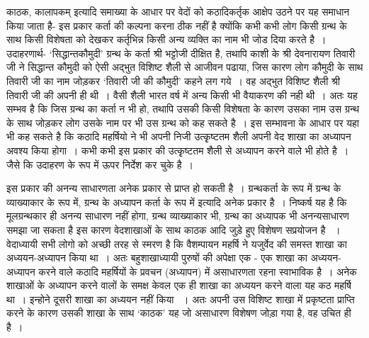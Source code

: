 काठक, कालापकम् इत्यादि समाख्या के आधार पर वेदों को कठादिकर्तृक आक्षेप उठने पर यह समाधान किया जाता है- इस प्रकार कर्ता की कल्पना करना ठीक नहीं है क्योंकि कभी कभी लोग किसी ग्रन्थ के साथ किसी विशेषता को देखकर कर्तृभिन्न किसी अन्य व्यक्ति का नाम भी जोड दिया करते है~। उदाहरणार्थ- ‘सिद्धान्तकौमुदी' ग्रन्थ के कर्ता श्री भट्टोजी दीक्षित है, तथापि काशी के श्री देवनारायण तिवारी जी ने सिद्धान्त कौमुदी को ऐसी अद्भुत विशिष्ट शैली से आजीवन पढाया, जिस कारण लोग कौमुदी के साथ तिवारी जी का नाम जोड़कर ‘तिवारी जी की कौमुदी' कहने लग गये~। वह अद्भुत विशिष्ट शैली श्री तिवारी जी की अपनी ही थी~। वैसी शैली भारत वर्ष में अन्य किसी भी वैयाकरण की नही थी~। अतः यह सम्भव है कि जिस ग्रन्थ का कर्ता न भी हो, तथापि उसकी किसी विशेषता के कारण उसका नाम उस ग्रन्थ के साथ जोड़कर लोग उसके नाम पर भी उस ग्रन्थ को कह सकते है~। इस सम्भावना के आधार पर यहा भी कह सकते है कि कठादि महर्षियो ने भी अपनी निजी उत्कृृष्टतम शैली अपनी वेद शाखा का अध्यापन अवश्य किया होगा~। कभी कभी इस प्रकार की उत्कृृष्टतम शैली से अध्यापन करने वाले भी होते है~। जैसे कि उदाहरण के रूप में ऊपर निर्देश कर चुके है~। 

इस प्रकार की अनन्य साधारणता अनेक प्रकार से प्राप्त हो सकती है~। ग्रन्थकर्ता के रूप में ग्रन्थ के व्याख्याकार के रूप में, ग्रन्थ के अध्यापन कर्ता के रूप में इत्यादि अनेक प्रकार है~। निष्कर्ष यह है कि मूलग्रन्थकार ही अनन्य साधारण नहीं होगा, ग्रन्थ व्याख्याकार भी, ग्रन्थ का अध्यापक भी अनन्यसाधारण समझा जा सकता है इस कारण वेदशाखाओं के साथ काठक आदि जुड़े हुए विशेषण सप्रयोजन है ~। वेदाध्यायी सभी लोगो को अच्छी तरह से स्मरण है कि वैशम्पायन महर्षि ने यजुर्वेद की समस्त शाखा का अध्ययन-अध्यापन किया था~। अतः बहुशाखाध्यायी पुरुषों की अपेक्षा एक - एक शाखा का अध्ययन-अध्यापन करने वाले कठादि महर्षियों के प्रवचन (अध्यापन) में असाधारणता रहना स्वाभाविक है~। अनेक शाखाओं के अध्यापन करने वालों के समक्ष केवल एक ही शाखा का अध्ययन करने वाला यह कठ महर्षि था~। इन्होने दूसरी शाखा का अध्ययन नहीं किया ~। अतः अपनी उस विशिष्ट शाखा में प्रकृष्टता प्राप्ति करने के कारण उसकी शाखा के साथ ‘काठक' यह जो असाधारण विशेषण जोड़ा गया है, वह उचित ही है~। 

